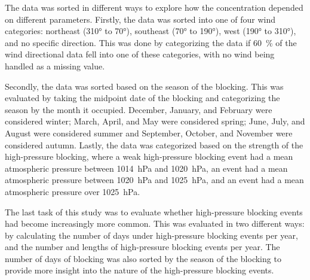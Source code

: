 The data was sorted in different ways to explore how the \PM concentration depended on different parameters. Firstly, the data was sorted into one of four wind categories: northeast (310° to 70°), southeast (70° to 190°), west (190° to 310°), and no specific direction. This was done by categorizing the data if \SI{60}{\%} of the wind directional data fell into one of these categories, with no wind being handled as a missing value.

Secondly, the data was sorted based on the season of the blocking. This was evaluated by taking the midpoint date of the blocking and categorizing the season by the month it occupied. December, January, and February were considered winter; March, April, and May were considered spring; June, July, and August were considered summer and September, October, and November were considered autumn. Lastly, the data was categorized based on the strength of the high-pressure blocking, where a weak high-pressure blocking event had a mean atmospheric pressure between \SI{1014}{\hecto\pascal} and \SI{1020}{\hecto\pascal}, an event had a mean atmospheric pressure between \SI{1020}{\hecto\pascal} and \SI{1025}{\hecto\pascal}, and an event had a mean atmospheric pressure over \SI{1025}{\hecto\pascal}.

The last task of this study was to evaluate whether high-pressure blocking events had become increasingly more common. This was evaluated in two different ways: by calculating the number of days under high-pressure blocking events per year, and the number and lengths of high-pressure blocking events per year. The number of days of blocking was also sorted by the season of the blocking to provide more insight into the nature of the high-pressure blocking events. 

